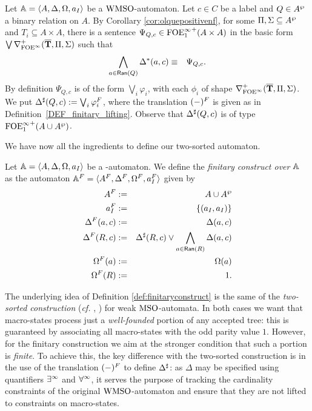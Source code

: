 \begin{definition}\label{PROP_DeltaPowerset}
Let $\mathbb{A} = \langle{A,\Delta,\Omega,a_I}\rangle$ be a $\mathrm{WMSO}$-automaton. Let $c \in C$ be a label and $Q \in A^{\wp}$ a binary relation on $A$. By Corollary \ref{cor:olquepositivenf}, for some $\Pi,\Sigma \subseteq A^{\wp}$ and $T_i \subseteq A \times A$, there is a sentence $\Psi_{Q,c} \in {\ensuremath{\mathrm{FOE}^{\infty}_1}}^+(A\times A)$ in the basic form $\bigvee \nabla^+_{\mathrm{FOE}^{\infty}}(\overline{{\mathbf{T}}},\Pi,\Sigma)$ such that
\begin{eqnarray*}
  \bigwedge_{a \in \mathsf{Ran}(Q)} \Delta^{*}(a,c) &\equiv& \Psi_{Q,c}.
\end{eqnarray*}
By definition $\Psi_{Q,c}$ is of the form $\bigvee_{i}\varphi_i$, with each $\phi_{i}$ of shape $\nabla^+_{\mathrm{FOE}^{\infty}}(\overline{{\mathbf{T}}},\Pi,\Sigma)$. We put $\Delta^{\sharp}(Q,c) := \bigvee_{i}\varphi_i^{F}$, where the translation $(-)^{F}$ is given as in Definition~\ref{DEF_finitary_lifting}. Observe that $\Delta^{\sharp}(Q,c)$ is of type ${\mathrm{FOE}^{\infty}_1}^+(A \cup A^{\wp})$.
\end{definition}

We have now all the ingredients to define our two-sorted automaton.

\begin{definition}\label{def:finitaryconstruct}
Let $\mathbb{A} = \langle{A,\Delta,\Omega,a_I}\rangle$ be a {\wmso-automaton}. We define the \emph{finitary construct over $\mathbb{A}$} as the automaton $\mathbb{A}^{F} = \langle{A^{F},\Delta^{F},\Omega^{F},a_I^{F}}\rangle$ given by
\begin{eqnarray*}
        A^{F} &:=& A \cup A^{\wp} \\
        a_I^{F} &:=& \{(a_I,a_I)\}\\
        \Delta^{F}(a,c) &:=& \Delta(a,c)\\
        \Delta^{F}(R,c) &:=& \Delta^{\sharp}(R,c) \vee \bigwedge_{a \in \mathsf{Ran}(R)} \Delta(a,c)\\
        \Omega^{F}(a) &:=& \Omega(a)\\
        \Omega^{F}(R) &:=& 1.
      \end{eqnarray*}
\end{definition}

The underlying idea of Definition \ref{def:finitaryconstruct} is the same of the \emph{two-sorted construction} (\emph{cf.} \cite[Def.~3.7]{Zanasi:Thesis:2012}, \cite{DBLP:conf/lics/FacchiniVZ13}) for weak $\mathrm{MSO}$-automata. In both cases we want that macro-states process just a \emph{well-founded} portion of any accepted tree: this is guaranteed by associating all macro-states with the odd parity value $1$. However, for the finitary construction we aim at the stronger condition that such a portion is \emph{finite}. To achieve this, the key difference with the two-sorted construction is in the use of the translation $(-)^{F}$ to define $\Delta^{\sharp}$: as $\Delta$ may be specified using quantifiers $\exists^\infty$ and $\forall^\infty$, it serves the purpose of tracking the cardinality constraints of the original $\mathrm{WMSO}$-automaton and ensure that they are not lifted to constraints on macro-states.

